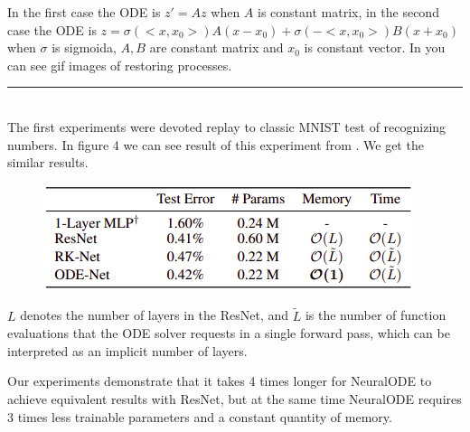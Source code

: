 \documentclass[a0]{a0poster}
\def\Head#1{\noindent{\LARGE\color{bluegray} #1}\bigskip}
\begin{document}
\begin{textblock}{7.0}
In the first case the ODE is $z' = A z$ when $A$ is constant matrix, in the second case the ODE is $z = \sigma( <x, x_0> ) A (x-x_0) + \sigma(-<x, x_0> ) B ( x + x_0 ) $ when $\sigma$ is sigmoida, $A, B$ are constant matrix and $x_0$ is constant vector. In \cite{my_git} you can see gif images of restoring processes.
 
\medskip
\hrule\medskip
\Head{MNIST test}\\
The first experiments were devoted replay to classic MNIST test of recognizing numbers. In figure 4 we can see result of this experiment from \cite{NeuralODE}. We get the similar results.

\begin{figure}
\centering
\includegraphics[width = 1\linewidth]{figures/MNIST_test.png}
\caption{}
\end{figure} $L$ denotes the number of layers in the ResNet, and $\tilde{L}$ is the number of function evaluations that the ODE solver requests in a single forward pass, which can be interpreted as an implicit number of layers.

Our experiments demonstrate that it takes 4 times longer for NeuralODE to achieve equivalent results with ResNet, but at the same time NeuralODE requires 3 times less trainable parameters and a constant quantity of memory.
\end{textblock}
\end{document}
